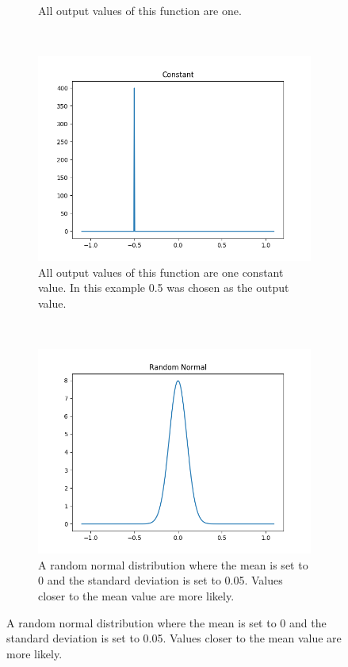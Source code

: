 \begin{figure}[h!]
\begin{subfigure}[t]{0.5\textwidth}
		\caption{All output values of this function are one.}
	\end{subfigure}
	~
	\begin{subfigure}[t]{0.5\textwidth}
		\centering
		\includegraphics[width=\textwidth]{img/methodology_neuralNetwork_initializerFunctions_constant.png}
		\caption{All output values of this function are one constant value. In this example 0.5 was chosen as the output value.}
	\end{subfigure}%
	~ 
	\begin{subfigure}[t]{0.5\textwidth}
		\centering
		\includegraphics[width=\textwidth]{img/methodology_neuralNetwork_initializerFunctions_randomNormal.png}
		\caption{A random normal distribution where the mean is set to 0 and the standard deviation is set to 0.05. Values closer to the mean value are more likely.}
	\end{subfigure}
\end{figure}

